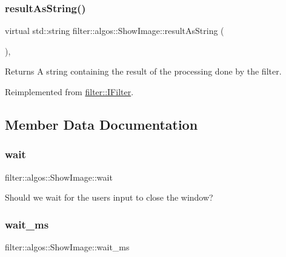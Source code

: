 \subsubsection{\texorpdfstring{result\+As\+String()}{resultAsString()}}
{\footnotesize\ttfamily virtual std\+::string filter\+::algos\+::\+Show\+Image\+::result\+As\+String (\begin{DoxyParamCaption}{ }\end{DoxyParamCaption})\hspace{0.3cm}{\ttfamily [inline]}, {\ttfamily [virtual]}}

\begin{DoxyReturn}{Returns}
A string containing the result of the processing done by the filter. 
\end{DoxyReturn}


Reimplemented from \hyperlink{classfilter_1_1_i_filter_ab99902b060a6d9edc3452a8c9f85e37e}{filter\+::\+I\+Filter}.



\subsection{Member Data Documentation}
\mbox{\label{classfilter_1_1algos_1_1_show_image_a5c05f36480a4e9d042d8277255818961}} 
\subsubsection{\texorpdfstring{wait}{wait}}
{\footnotesize\ttfamily filter\+::algos\+::\+Show\+Image\+::wait}

Should we wait for the user\textquotesingle{}s input to close the window? \mbox{\label{classfilter_1_1algos_1_1_show_image_a2d6440527607e2b53027b1a74140a38c}} 
\subsubsection{\texorpdfstring{wait\+\_\+ms}{wait\_ms}}
{\footnotesize\ttfamily filter\+::algos\+::\+Show\+Image\+::wait\+\_\+ms}

